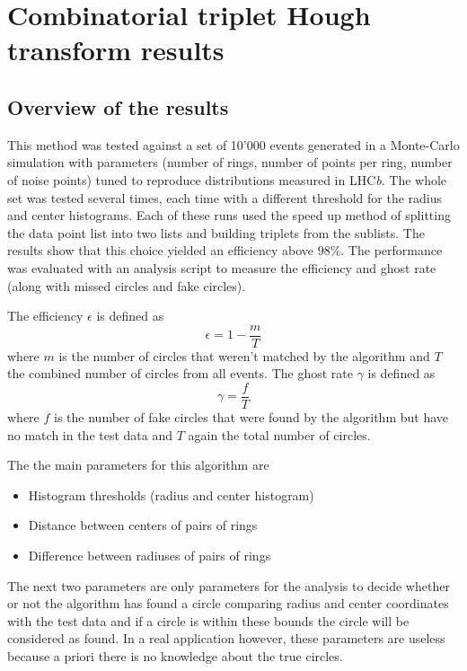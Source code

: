 \documentclass[11pt]{scrreprt}
\begin{document}
\newpage
\section{Combinatorial triplet Hough transform results} %
\label{sec:combinatorial_approach_results}

\subsection{Overview of the results} %
\label{sub:overview_of_the_results}

This method was tested against a set of 10'000 events generated in a Monte-Carlo simulation with parameters (number of rings, 
number of points per ring, number of noise points) tuned to reproduce distributions measured in LHC\textit{b}. 
The whole set was tested several times, each time with a different threshold for the radius and center histograms. 
Each of these runs used the speed up method of splitting the data point list into two lists and building triplets from 
the sublists. The results show that this choice yielded an efficiency above $98\%$. 
The performance was evaluated with an analysis script to measure the efficiency and ghost rate (along with missed 
circles and fake circles).

The efficiency $\epsilon$ is defined as 
\begin{equation}
\epsilon = 1 - \frac{m}{T}    
\end{equation}
where $m$ is the number of circles that weren't matched by the algorithm and $T$ the combined number of circles from
all events. The ghost rate $\gamma$ is defined as 
\begin{equation}
  \gamma = \frac{f}{T} 
\end{equation}
where $f$ is the number of fake circles that were found by the algorithm but have no match in the test data and $T$ again the
total number of circles.


The the main parameters for this algorithm are
\begin{itemize}
  \item Histogram thresholds (radius and center histogram)
  \item Distance between centers of pairs of rings
  \item Difference between radiuses of pairs of rings
\end{itemize}

The next two parameters are only parameters for the analysis to decide whether or not the algorithm has found a circle comparing radius
and center coordinates with the test data and if a circle is within these bounds the circle will be considered as found. In a real application
however, these parameters are useless because a priori there is no knowledge about the true circles.
\end{document}
